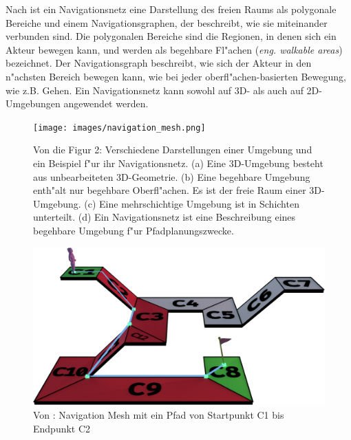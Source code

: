 Nach \cite{Mesh:16} ist ein Navigationsnetz eine Darstellung des freien Raums als polygonale Bereiche und einem Navigationsgraphen, der beschreibt, wie sie miteinander verbunden sind. Die polygonalen Bereiche sind die Regionen, in denen sich ein Akteur bewegen kann, und werden als begehbare Fl"achen (\textit{eng. walkable areas}) bezeichnet. Der Navigationsgraph beschreibt, wie sich der Akteur in den n"achsten Bereich bewegen kann, wie bei jeder oberfl"achen-basierten Bewegung, wie z.B. Gehen. Ein Navigationsnetz kann sowohl auf 3D- als auch auf 2D-Umgebungen angewendet werden.

\begin{figure} %
	\centering
	\texttt{[image: images/navigation\_mesh.png]}
	\caption{Von \cite[~S. 93]{Mesh:16} die Figur 2: Verschiedene Darstellungen einer Umgebung und ein Beispiel f"ur ihr Navigationsnetz. (a) Eine 3D-Umgebung besteht aus unbearbeiteten 3D-Geometrie. (b) Eine begehbare Umgebung enth"alt nur begehbare Oberfl"achen. Es ist der freie Raum einer 3D-Umgebung. (c) Eine mehrschichtige Umgebung ist in Schichten unterteilt. (d) Ein Navigationsnetz ist eine Beschreibung eines begehbare Umgebung f"ur Pfadplanungszwecke.}
	\label{sec1a}
\end{figure}
\begin{figure} %
	\centering
	\includegraphics[width=\textwidth]{images/mesh_with_path.png}
	\caption{Von \cite{Mesh:18}: Navigation Mesh mit ein Pfad von Startpunkt C1 bis Endpunkt C2}
	\label{sec1b}
\end{figure}


